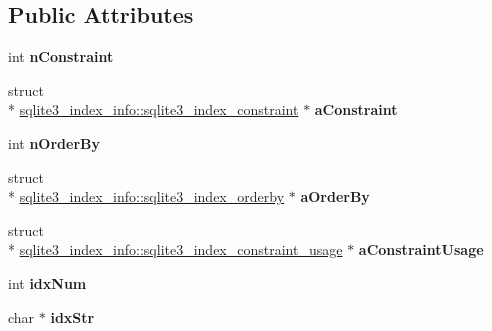 \subsection*{Public Attributes}
\begin{DoxyCompactItemize}
\item 
\hypertarget{structsqlite3__index__info_ae861993a30ce914a5214eab2579d935a}{int {\bfseries n\-Constraint}}\label{structsqlite3__index__info_ae861993a30ce914a5214eab2579d935a}

\item 
\hypertarget{structsqlite3__index__info_a634aa93834e2b47acf34454746c0f248}{struct \\*
\hyperlink{structsqlite3__index__info_1_1sqlite3__index__constraint}{sqlite3\-\_\-index\-\_\-info\-::sqlite3\-\_\-index\-\_\-constraint} $\ast$ {\bfseries a\-Constraint}}\label{structsqlite3__index__info_a634aa93834e2b47acf34454746c0f248}

\item 
\hypertarget{structsqlite3__index__info_a3ef850fdc57eddbc8189fe84d0a9044e}{int {\bfseries n\-Order\-By}}\label{structsqlite3__index__info_a3ef850fdc57eddbc8189fe84d0a9044e}

\item 
\hypertarget{structsqlite3__index__info_a6823a68979e19d8e332389361e920ef9}{struct \\*
\hyperlink{structsqlite3__index__info_1_1sqlite3__index__orderby}{sqlite3\-\_\-index\-\_\-info\-::sqlite3\-\_\-index\-\_\-orderby} $\ast$ {\bfseries a\-Order\-By}}\label{structsqlite3__index__info_a6823a68979e19d8e332389361e920ef9}

\item 
\hypertarget{structsqlite3__index__info_a79b8a969dd7d582fc2ea3c0fbc5adb56}{struct \\*
\hyperlink{structsqlite3__index__info_1_1sqlite3__index__constraint__usage}{sqlite3\-\_\-index\-\_\-info\-::sqlite3\-\_\-index\-\_\-constraint\-\_\-usage} $\ast$ {\bfseries a\-Constraint\-Usage}}\label{structsqlite3__index__info_a79b8a969dd7d582fc2ea3c0fbc5adb56}

\item 
\hypertarget{structsqlite3__index__info_afcee17707a1c147fbd55c23c807fdae3}{int {\bfseries idx\-Num}}\label{structsqlite3__index__info_afcee17707a1c147fbd55c23c807fdae3}

\item 
\hypertarget{structsqlite3__index__info_ac63f4ebfe8d9331b040fa9e0e47c9d70}{char $\ast$ {\bfseries idx\-Str}}\label{structsqlite3__index__info_ac63f4ebfe8d9331b040fa9e0e47c9d70}


\end{DoxyCompactItemize}
